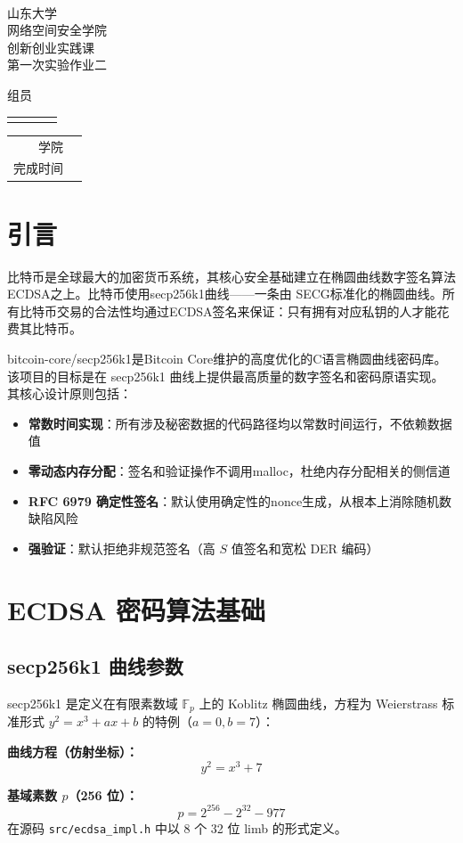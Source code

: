 \documentclass[a4paper,12pt]{ctexart}
\newcommand{\makecover}{
    \begin{center}
        ~\\[0.5cm]
        {\heiti\zihao{0} 山东大学}\\[0.5cm]
        {\heiti\zihao{0} 网络空间安全学院}\\[3cm]
        {\heiti\zihao{0} 创新创业实践课}\\[1cm]
        {\heiti\zihao{0} 第一次实验作业二}\\[2.5cm]

\noindent
\begin{minipage}{\textwidth}
    \centering
    {\heiti\zihao{-4} 组员}\\[0.8cm]
    \renewcommand{\arraystretch}{1.8}
    \begin{tabular}{>{\centering\arraybackslash}p{3.5cm}>{\centering\arraybackslash}p{3.5cm}>{\centering\arraybackslash}p{3.5cm}>{\centering\arraybackslash}p{3.5cm}}
        \underline{\makebox[2.8cm]{李瑞佳}} &
        \underline{\makebox[2.8cm]{岳智宇}} &
        \underline{\makebox[2.8cm]{薛俊东}} &
        \underline{\makebox[2.8cm]{张金浩}} \\[0.3cm]
    \end{tabular}
\end{minipage}

        \vspace{2.5cm}

        \begin{tabular}{>{\heiti\zihao{-3}}r p{10cm}}
            学\hspace{2em}院 & \underline{\makebox[10cm][c]{网络空间安全学院}} \\[0.5cm]
            完成时间 & \underline{\makebox[10cm][c]{2026年7月20日}} \\
        \end{tabular}
    \end{center}
    \thispagestyle{empty}

    \newpage
}
\begin{document}
\makecover

\newpage
\tableofcontents
\setcounter{page}{0}
\clearpage
{}

\section{引言}

比特币是全球最大的加密货币系统，其核心安全基础建立在椭圆曲线数字签名算法ECDSA之上。比特币使用secp256k1曲线——一条由 SECG标准化的椭圆曲线。所有比特币交易的合法性均通过ECDSA签名来保证：只有拥有对应私钥的人才能花费其比特币。

bitcoin-core/secp256k1是Bitcoin Core维护的高度优化的C语言椭圆曲线密码库。该项目的目标是在 secp256k1 曲线上提供最高质量的数字签名和密码原语实现。其核心设计原则包括：

\begin{itemize}[leftmargin=*]
  \item \textbf{常数时间实现}：所有涉及秘密数据的代码路径均以常数时间运行，不依赖数据值
  \item \textbf{零动态内存分配}：签名和验证操作不调用malloc，杜绝内存分配相关的侧信道
  \item \textbf{RFC 6979 确定性签名}：默认使用确定性的nonce生成，从根本上消除随机数缺陷风险
  \item \textbf{强验证}：默认拒绝非规范签名（高 $S$ 值签名和宽松 DER 编码）
\end{itemize}


\section{ECDSA 密码算法基础}

\subsection{secp256k1 曲线参数}
secp256k1 是定义在有限素数域 $\mathbb{F}_p$ 上的 Koblitz 椭圆曲线，方程为 Weierstrass 标准形式 $y^2 = x^3 + ax + b$ 的特例（$a=0, b=7$）：

\textbf{曲线方程（仿射坐标）：}
$$y^2 = x^3 + 7$$

\textbf{基域素数 $p$（256 位）：}
$$p = 2^{256} - 2^{32} - 977$$
在源码 \texttt{src/ecdsa\_impl.h} 中以 8 个 32 位 limb 的形式定义。
\end{document}
